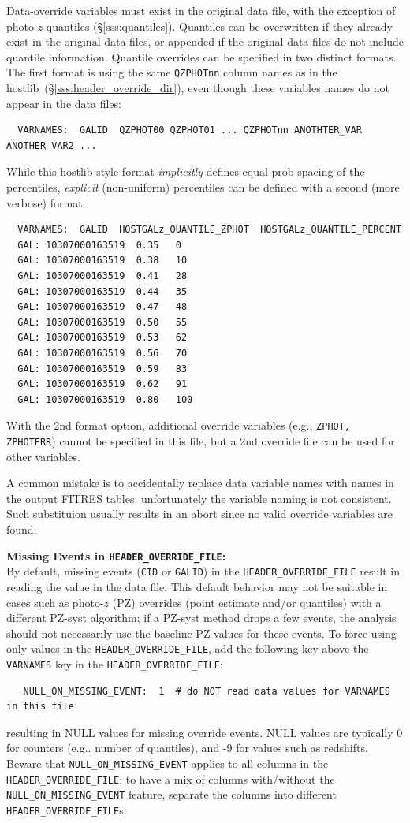 \documentclass[12pt]{article}
\newcommand{\hostlib}{{\sc hostlib}}
\begin{document}

Data-override variables must exist in the original data file,
with the exception of photo-$z$ quantiles (\S\ref{sss:quantiles}).
Quantiles can be overwritten if they already exist in the
original data files, or appended if the original data files
do not include quantile information. Quantile overrides can be specified
in two distinct formats. The first format is using the same {\tt QZPHOTnn}
column names as in the \hostlib\ (\S\ref{sss:header_override_dir}),
even though these variables names do not appear in the data files:
\begin{verbatim}
  VARNAMES:  GALID  QZPHOT00 QZPHOT01 ... QZPHOTnn ANOTHTER_VAR ANOTHER_VAR2 ...
\end{verbatim}
While this {\hostlib}-style format {\it implicitly} defines equal-prob spacing of the
percentiles, {\it explicit} (non-uniform) percentiles can be defined with a second 
(more verbose) format:
\clearpage
\begin{verbatim}
  VARNAMES:  GALID  HOSTGALz_QUANTILE_ZPHOT  HOSTGALz_QUANTILE_PERCENT
  GAL: 10307000163519  0.35   0
  GAL: 10307000163519  0.38   10
  GAL: 10307000163519  0.41   28
  GAL: 10307000163519  0.44   35
  GAL: 10307000163519  0.47   48
  GAL: 10307000163519  0.50   55
  GAL: 10307000163519  0.53   62
  GAL: 10307000163519  0.56   70
  GAL: 10307000163519  0.59   83
  GAL: 10307000163519  0.62   91
  GAL: 10307000163519  0.80   100
\end{verbatim}
%
With the 2nd format option, additional override variables (e.g., {\tt ZPHOT, ZPHOTERR})
cannot be specified in this file, but a 2nd override file can be used for other variables.

A common  mistake is to accidentally replace data variable names with names in the
output FITRES tables: unfortunately the variable naming is not consistent.
Such substituion usually results in an abort since no
valid override variables are found.

\bigskip\noindent
{\bf Missing Events in {\tt HEADER\_OVERRIDE\_FILE}:} \\
By default, missing events ({\tt CID} or {\tt GALID}) in the 
\verb|HEADER_OVERRIDE_FILE| result in reading the value in the data file.
This default behavior may not be suitable in cases such as photo-$z$ (PZ) overrides
(point estimate and/or quantiles) with a different PZ-syst algorithm;
if a PZ-syst method drops a few events, the analysis should not necessarily
use the baseline PZ values for these events. To force using only values
in the \verb|HEADER_OVERRIDE_FILE|, add the following key above the {\tt VARNAMES}
key in the \verb|HEADER_OVERRIDE_FILE|:
\begin{verbatim}
   NULL_ON_MISSING_EVENT:  1  # do NOT read data values for VARNAMES in this file
\end{verbatim}
resulting in NULL values for missing override events. NULL values are typically 0 for
counters (e.g.. number of quantiles), and -9 for values such as redshifts.
Beware that \verb|NULL_ON_MISSING_EVENT| applies to all columns in the 
\verb|HEADER_OVERRIDE_FILE|; to have a mix of columns with/without the
\verb|NULL_ON_MISSING_EVENT| feature, separate the columns into different
\verb|HEADER_OVERRIDE_FILE|s.
\end{document}
